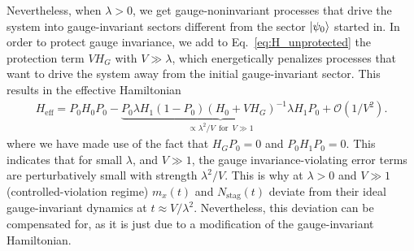 \documentclass[aps,prl,reprint,twocolumn,superscriptaddress,floatfix,nofootinbib]{revtex4-1}
\begin{document}
Nevertheless, when $\lambda>0$, we get gauge-noninvariant processes that drive the system into gauge-invariant sectors different from the sector $\ket{\psi_0}$ started in. In order to protect gauge invariance, we add to Eq.~\eqref{eq:H_unprotected} the protection term $VH_G$ with $V\gg\lambda$, which energetically penalizes processes that want to drive the system away from the initial gauge-invariant sector. This results in the effective Hamiltonian \cite{cohen1992atom-S,Lewenstein_review-S}
\begin{align}\label{eq:Heff}
H_\text{eff}=P_\mathrm{0}H_0P_\mathrm{0}-\underbrace{P_\mathrm{0}\lambda H_1(1-P_\mathrm{0})(H_0+VH_G)^{-1}\lambda H_1P_\mathrm{0}}_{\propto\lambda^2/V\,\,\,\text{for}\,\,\,V\gg1}+\mathcal{O}(1/V^2).
\end{align}
where we have made use of the fact that $H_GP_\mathrm{0}=0$ and $P_\mathrm{0}H_1P_\mathrm{0}=0$. This indicates that for small $\lambda$, and $V\gg1$, the gauge invariance-violating error terms are perturbatively small with strength $\lambda^2/V$. This is why at $\lambda>0$ and $V\gg1$ (controlled-violation regime) $m_x(t)$ and $N_\text{stag}(t)$ deviate from their ideal gauge-invariant dynamics at $t\approx V/\lambda^2$.
Nevertheless, this deviation can be compensated for, as it is just due to a modification of the gauge-invariant Hamiltonian.
\end{document}
